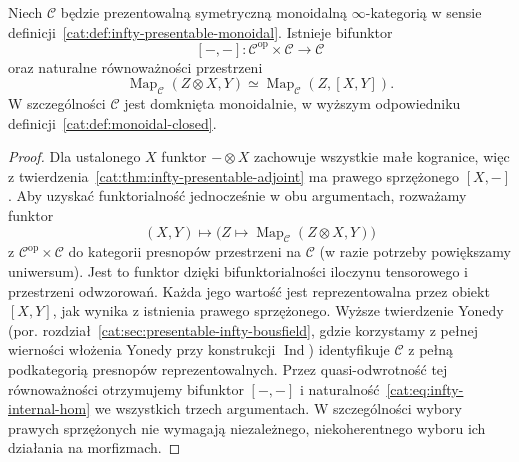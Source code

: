\begin{twierdzenie}\label{cat:thm:infty-presentable-closed}
Niech $\mathcal C$ będzie prezentowalną symetryczną monoidalną $\infty$-kategorią w sensie definicji~\ref{cat:def:infty-presentable-monoidal}. Istnieje bifunktor
\[
 [-,-]:\mathcal C^{\mathrm{op}}\times\mathcal C\longrightarrow\mathcal C
\]
oraz naturalne równoważności przestrzeni
\begin{equation}\label{cat:eq:infty-internal-hom}
 \operatorname{Map}_{\mathcal C}(Z\otimes X,Y)
 \simeq \operatorname{Map}_{\mathcal C}(Z,[X,Y]).
\end{equation}
W szczególności $\mathcal C$ jest domknięta monoidalnie, w wyższym odpowiedniku definicji~\ref{cat:def:monoidal-closed}.
\end{twierdzenie}
\begin{proof}
Dla ustalonego $X$ funktor $-\otimes X$ zachowuje wszystkie małe kogranice, więc z twierdzenia~\ref{cat:thm:infty-presentable-adjoint} ma prawego sprzężonego $[X,-]$. Aby uzyskać funktorialność jednocześnie w obu argumentach, rozważamy funktor
\[
 (X,Y)\longmapsto
 \bigl(Z\longmapsto\operatorname{Map}_{\mathcal C}(Z\otimes X,Y)\bigr)
\]
z $\mathcal C^{\mathrm{op}}\times\mathcal C$ do kategorii presnopów przestrzeni na $\mathcal C$ (w razie potrzeby powiększamy uniwersum). Jest to funktor dzięki bifunktorialności iloczynu tensorowego i przestrzeni odwzorowań. Każda jego wartość jest reprezentowalna przez obiekt $[X,Y]$, jak wynika z istnienia prawego sprzężonego. Wyższe twierdzenie Yonedy (por. rozdział~\ref{cat:sec:presentable-infty-bousfield}, gdzie korzystamy z pełnej wierności włożenia Yonedy przy konstrukcji $\operatorname{Ind}$) identyfikuje $\mathcal C$ z pełną podkategorią presnopów reprezentowalnych. Przez quasi-odwrotność tej równoważności otrzymujemy bifunktor $[-,-]$ i naturalność~\eqref{cat:eq:infty-internal-hom} we wszystkich trzech argumentach. W szczególności wybory prawych sprzężonych nie wymagają niezależnego, niekoherentnego wyboru ich działania na morfizmach.
\end{proof}

